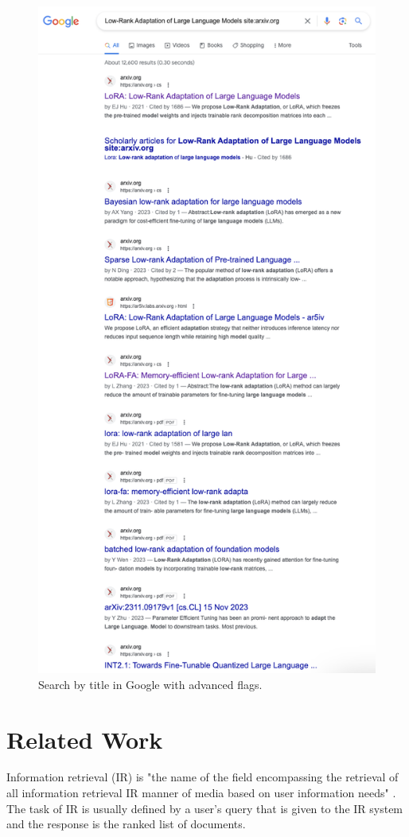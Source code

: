 \documentclass{article}
\begin{document}
    \begin{figure}[H]
        \centering
        \includegraphics[width=0.65\linewidth]{img/search_google_advanced.png}
        \caption{Search by title in Google with advanced flags.}
        \label{fig:advanced-google-search}
    \end{figure}

\section{Related Work}\label{sec:related}

    Information retrieval (IR) is "the name of the field encompassing the retrieval of all information retrieval IR manner of media based on user information needs" \cite{jurafsky}. The task of IR is usually defined by a user's query that is given to the IR system and the response is the ranked list of documents. 
\end{document}
